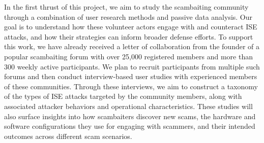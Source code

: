 In the first thrust of this project, we aim to study the scambaiting community through a combination of user research methods and passive data analysis. Our goal is to understand how these volunteer actors engage with and counteract ISE attacks, and how their strategies can inform broader defense efforts. To support this work, we have already received a letter of collaboration from the founder of a popular scambaiting forum with over 25,000 registered members and more than 300 weekly active participants. We plan to recruit participants from multiple such forums and then conduct interview-based user studies with experienced members of these communities. Through these interviews, we aim to construct a taxonomy of the types of ISE attacks targeted by the community members, along with associated attacker behaviors and operational characteristics. These studies will also surface insights into how scambaiters discover new scams, the hardware and software configurations they use for engaging with scammers, and their intended outcomes across different scam scenarios. 

